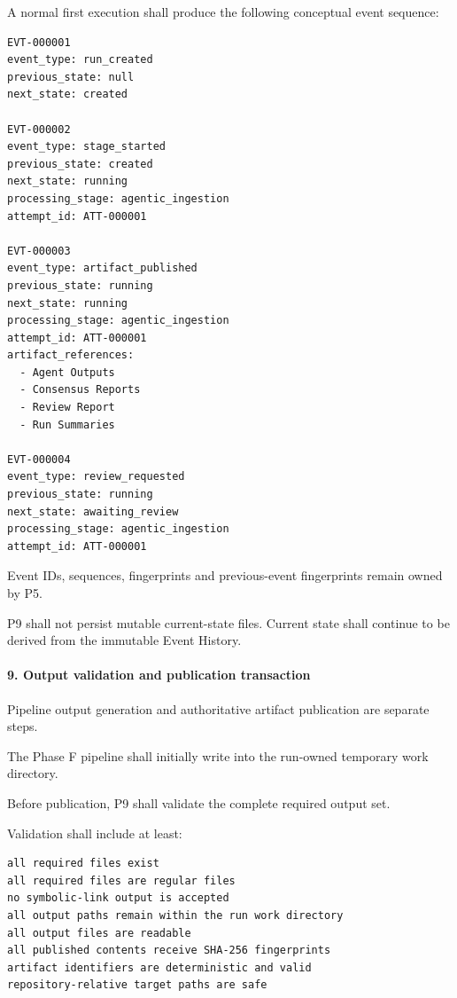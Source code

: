 A normal first execution shall produce the following conceptual event sequence:

\begin{verbatim}
EVT-000001
event_type: run_created
previous_state: null
next_state: created

EVT-000002
event_type: stage_started
previous_state: created
next_state: running
processing_stage: agentic_ingestion
attempt_id: ATT-000001

EVT-000003
event_type: artifact_published
previous_state: running
next_state: running
processing_stage: agentic_ingestion
attempt_id: ATT-000001
artifact_references:
  - Agent Outputs
  - Consensus Reports
  - Review Report
  - Run Summaries

EVT-000004
event_type: review_requested
previous_state: running
next_state: awaiting_review
processing_stage: agentic_ingestion
attempt_id: ATT-000001
\end{verbatim}

Event IDs, sequences, fingerprints and previous-event fingerprints remain owned by P5.

P9 shall not persist mutable current-state files. Current state shall continue to be derived from the immutable Event History.

\hypertarget{9-output-validation-and-publication-transaction}{%
\paragraph{9. Output validation and publication transaction}\label{9-output-validation-and-publication-transaction}}

Pipeline output generation and authoritative artifact publication are separate steps.

The Phase F pipeline shall initially write into the run-owned temporary work directory.

Before publication, P9 shall validate the complete required output set.

Validation shall include at least:

\begin{verbatim}
all required files exist
all required files are regular files
no symbolic-link output is accepted
all output paths remain within the run work directory
all output files are readable
all published contents receive SHA-256 fingerprints
artifact identifiers are deterministic and valid
repository-relative target paths are safe
\end{verbatim}

